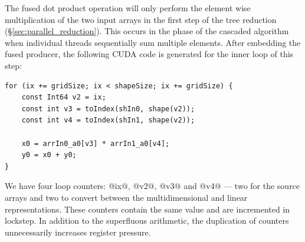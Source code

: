 The fused dot product operation will only perform the element wise
multiplication of the two input arrays in the first step of the tree reduction
(\S\ref{sec:parallel_reduction}). This occurs in the phase of the cascaded
algorithm when individual threads sequentially sum multiple elements. After
embedding the fused producer, the following CUDA code is generated for the inner
loop of this step:
%
%
%
\begin{lstlisting}[style=cuda
    ,firstnumber=18
    ,label=lst:dotp_cuda
    ,caption={Generated CUDA code for the first step of fused dot product}]
for (ix += gridSize; ix < shapeSize; ix += gridSize) {
    const Int64 v2 = ix;
    const int v3 = toIndex(shIn0, shape(v2));
    const int v4 = toIndex(shIn1, shape(v2));

    x0 = arrIn0_a0[v3] * arrIn1_a0[v4];
    y0 = x0 + y0;
}
\end{lstlisting}
%
We have four loop counters: @ix@, @v2@, @v3@ and @v4@ ---
two for the source arrays and two to convert between the multidimensional and
linear representations. These counters contain the same value and are
incremented in lockstep. In addition to the superfluous arithmetic, the
duplication of counters unnecessarily increases register pressure.

